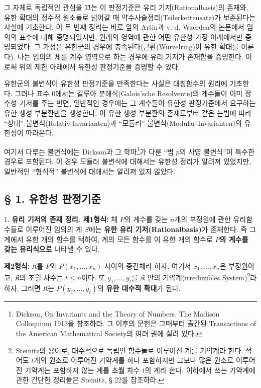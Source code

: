 그 자체로 독립적인 관심을 끄는 이 판정기준은 유리 기저(Rationalbasis)의 존재와, 유한 확대의 정수적 원소들로 넘어갈 때 약수사슬정리(Teilerkettensatz)가 보존된다는 사실에 기초한다. 이 두 번째 정리는 바로 앞의 Artin과 v. d. Waerden의 논문에서 임의의 표수에 대해 증명되었지만, 원래의 영역에 관한 어떤 유한성 가정 아래에서만 증명되었다. 그 가정은 유한군의 경우에 충족된다(근환(Wurzelring)이 유한 확대를 이룬다). 나는 임의의 체를 계수 영역으로 하는 경우에 유리 기저가 존재함을 증명한다. 이로써 위의 제한 아래에서 유한성 판정기준을 증명할 수 있다.

유한군의 불변식이 유한성 판정기준을 만족한다는 사실은 대칭함수의 원리에 기초한다. 그러나 표수 0에서는 갈루아 분해식(Galois'sche Resolvente)의 계수들이 이미 정수성 기저를 주는 반면, 일반적인 경우에는 그 계수들이 유한성 판정기준에서 요구하는 유한 생성 부분환만을 생성한다. 이 유한 생성 부분환의 존재로부터 같은 논법에 따라 ``상대'' 불변식(Relativ-Invarianten)과 ``모듈러'' 불변식(Modular-Invarianten)의 유한성이 따라온다.

여기서 다루는 불변식에는 Dickson과 그 학파\footnote{Dickson, On Invariants and the Theory of Numbers. The Madison Colloquium 1913을 참조하라. 그 이후의 문헌은 그때부터 출간된 Transactions of the American Mathematical Society의 여러 권에 실려 있다.}가 다룬 ``법 $p$의 사영 불변식''이 특수한 경우로 포함된다. 이 경우 모듈러 불변식에 대해서는 유한성 정리가 알려져 있었지만, 일반적인 ``형식적'' 불변식에 대해서는 알려져 있지 않았다.

\subsection*{§ 1. 유한성 판정기준}

1. \textbf{유리 기저의 존재 정리. 제1형식:} 체 $P$의 계수를 갖는 $n$개의 부정원에 관한 유리함수들로 이루어진 임의의 계 $S$에는 \textbf{유한 유리 기저(Rationalbasis)}가 존재한다. 즉 그 계에서 유한 개의 함수를 택하여, 계의 모든 함수를 이 유한 개의 함수로 \textbf{$P$의 계수를 갖는 유리식으로} 나타낼 수 있다.

\textbf{제2형식:} $\mathfrak K$를 $P$와 $P(x_1,\ldots,x_n)$ 사이의 중간체라 하자. 여기서 $x_1,\ldots,x_n$은 부정원이고, $\mathfrak K$의 초월 차수는 $t\leq n$이다. 또 $y_1,\ldots,y_t$를 $\mathfrak K$ 안의 기약계(irreduzibles System)\footnote{Steinitz의 용어로, 대수적으로 독립인 함수들로 이루어진 계를 기약계라 한다. 적어도 $t$개의 원소로 이루어진 기약계를 하나 포함하지만 그보다 많은 원소로 이루어진 기약계는 포함하지 않는 계를 초월 차수 $t$의 계라 한다. 이하에서 쓰는 기약계에 관한 간단한 정리들은 Steinitz, § 22를 참조하라.}라 하자. 그러면 $\mathfrak K$는 $P(y_1,\ldots,y_t)$의 \textbf{유한 대수적 확대}가 된다.

